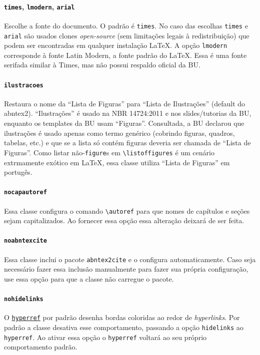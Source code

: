 \documentclass[embeddedlogo]{ufsc-thesis-rn46-2019}
\newcommand{\lacmd}[1]{\texttt{\textbackslash{}#1}}
\begin{document}
\paragraph*{\texttt{times}, \texttt{lmodern}, \texttt{arial}} Escolhe a fonte
do documento. O padrão é \texttt{times}. No caso das escolhas \texttt{times} e
\texttt{arial} são usados clones \emph{open-source} (sem limitações legais à
redistribuição) que podem ser encontradas em qualquer instalação \LaTeX. A
opção \texttt{lmodern} corresponde à fonte Latin Modern, a fonte padrão do
\LaTeX. Essa é uma fonte serifada similar à Times, mas não possui respaldo
oficial da BU.

\paragraph*{\texttt{ilustracoes}} Restaura o nome da ``Lista de Figuras'' para
``Lista de Ilustrações'' (default do abntex2). ``Ilustrações'' é usado na NBR
14724:2011 e nos slides/tutorias da BU, enquanto os templates da BU usam
``Figuras''. Consultada, a BU declarou que ilustrações é usado apenas como termo
genérico (cobrindo figuras, quadros, tabelas, etc.) e que se a lista só contém
figuras deveria ser chamada de ``Lista de Figuras''. Como listar
não-\texttt{figure}s em \lacmd{listoffigures} é um cenário extrmamente exótico
em \LaTeX, essa classe utiliza ``Lista de Figuras'' em portugês.

\paragraph*{\texttt{nocapautoref}} Essa classe configura o comando
\lacmd{autoref} para que nomes de capítulos e seções sejam capitalizados. Ao
fornecer essa opção essa alteração deixará de ser feita.

\paragraph*{\texttt{noabntexcite}} Essa classe inclui o pacote
\texttt{abntex2cite} e o configura automaticamente. Caso seja necessário fazer
essa inclusão manualmente para fazer sua própria configuração, use essa opção
para que a classe não carregue o pacote.

\paragraph*{\texttt{nohidelinks}} O
\href{https://ctan.org/pkg/hyperref}{\texttt{hyperref}} por padrão desenha
bordas coloridas ao redor de \emph{hyperlinks}. Por padrão a classe desativa
esse comportamento, passando a opção \texttt{hidelinks} ao \texttt{hyperref}.
Ao ativar essa opção o \texttt{hyperref} voltará ao seu próprio comportamento
padrão.
\end{document}
